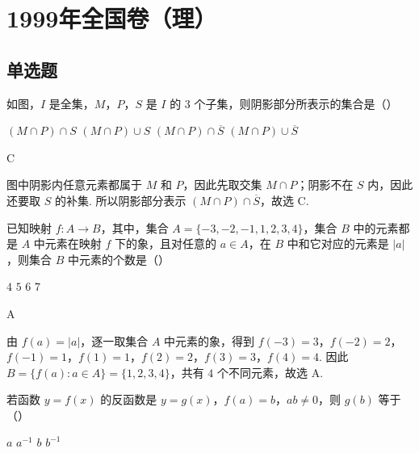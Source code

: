 \chapter{1999年全国卷（理）}
\section{单选题}

\begin{problem}
如图，\(I\) 是全集，\(M\)，\(P\)，\(S\) 是 \(I\) 的 \(3\) 个子集，则阴影部分所表示的集合是（\quad）


\choices
    {\((M\cap P)\cap S\)}
    {\((M\cap P)\cup S\)}
    {\((M\cap P)\cap \overline{S}\)}
    {\((M\cap P)\cup \overline{S}\)}
\end{problem}

\begin{answer}
C
\end{answer}

\begin{solution}
图中阴影内任意元素都属于 \(M\) 和 \(P\)，因此先取交集 \(M\cap P\)；阴影不在 \(S\) 内，因此还要取 \(S\) 的补集. 所以阴影部分表示
\((M\cap P)\cap\overline{S}\)，故选 C.
\end{solution}

\begin{problem}
已知映射 \(f:A\to B\)，其中，集合 \(A=\{-3,-2,-1,1,2,3,4\}\)，集合 \(B\) 中的元素都是 \(A\) 中元素在映射 \(f\) 下的象，且对任意的 \(a\in A\)，在 \(B\) 中和它对应的元素是 \(|a|\)，则集合 \(B\) 中元素的个数是（\quad）

\choices
    {\(4\)}
    {\(5\)}
    {\(6\)}
    {\(7\)}
\end{problem}

\begin{answer}
A
\end{answer}

\begin{solution}
由 \(f(a)=|a|\)，逐一取集合 \(A\) 中元素的象，得到
\(f(-3)=3\)，\(f(-2)=2\)，\(f(-1)=1\)，\(f(1)=1\)，\(f(2)=2\)，\(f(3)=3\)，\(f(4)=4\).
因此
\(B=\{f(a):a\in A\}=\{1,2,3,4\}\)，共有 \(4\) 个不同元素，故选 A.
\end{solution}

\begin{problem}
若函数 \(y=f(x)\) 的反函数是 \(y=g(x)\)，\(f(a)=b\)，\(ab\neq 0\)，则 \(g(b)\) 等于（\quad）

\choices
    {\(a\)}
    {\(a^{-1}\)}
    {\(b\)}
    {\(b^{-1}\)}
\end{problem}

